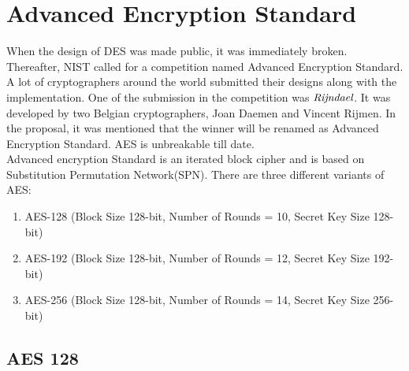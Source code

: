 \documentclass[11pt]{article}
\begin{document}
\section{Advanced Encryption Standard}
When the design of DES was made public, it was immediately broken. Thereafter, NIST called for a competition named Advanced Encryption Standard. A lot of cryptographers around the world submitted their designs along with the implementation. One of the submission in the competition was $\emph{Rijndael}$. It was developed by two Belgian cryptographers, Joan Daemen and Vincent Rijmen. In the proposal, it was mentioned that the winner will be renamed as Advanced Encryption Standard. AES is unbreakable till date.\\

Advanced encryption Standard is an iterated block cipher and is based on Substitution Permutation Network(SPN). There are three different variants of AES:
\begin{enumerate}
    \item AES-128 (Block Size 128-bit, Number of Rounds = 10, Secret Key Size 128-bit)
    \item AES-192 (Block Size 128-bit, Number of Rounds = 12, Secret Key Size 192-bit)
    \item AES-256 (Block Size 128-bit, Number of Rounds = 14, Secret Key Size 256-bit)
\end{enumerate}

\subsection{AES 128}
\end{document}
